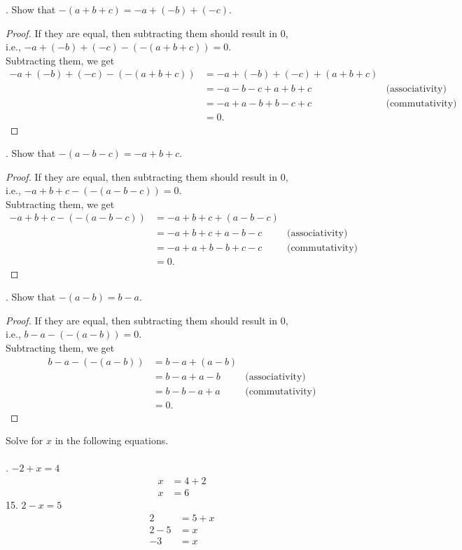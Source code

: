 \documentclass[12pt]{article}
\begin{document}
. Show that $-(a+b+c)=-a+(-b)+(-c)$.
\begin{proof}
If they are equal, then subtracting them should result in 0, \\
i.e., $-a+(-b)+(-c)-(-(a+b+c))=0$. \\
Subtracting them, we get
\begin{align*}
-a+(-b)+(-c)-(-(a+b+c))&=-a+(-b)+(-c)+(a+b+c) \\
&=-a-b-c+a+b+c &\text{(associativity)} \\
&=-a+a-b+b-c+c &\text{(commutativity)} \\
&=0.
\end{align*}
\end{proof}
. Show that $-(a-b-c)=-a+b+c$.
\begin{proof}
If they are equal, then subtracting them should result in 0, \\
i.e., $-a+b+c-(-(a-b-c))=0$. \\
Subtracting them, we get
\begin{align*}
-a+b+c-(-(a-b-c))&=-a+b+c+(a-b-c) \\
&=-a+b+c+a-b-c &\text{(associativity)} \\
&=-a+a+b-b+c-c &\text{(commutativity)} \\
&=0.
\end{align*}
\end{proof}
. Show that $-(a-b)=b-a$.
\begin{proof}
If they are equal, then subtracting them should result in 0, \\
i.e., $b-a-(-(a-b))=0$. \\
Subtracting them, we get
\begin{align*}
b-a-(-(a-b))&=b-a+(a-b) \\
&=b-a+a-b &\text{(associativity)} \\
&=b-b-a+a &\text{(commutativity)} \\
&=0.
\end{align*}
\end{proof}
\noindent Solve for $x$ in the following equations. \\
\\
. $-2+x=4$
\begin{align*}
x&=4+2 \\
x&=6
\end{align*}
15. $2-x=5$
\begin{align*}
2&=5+x \\
2-5&=x \\
-3&=x
\end{align*}
\end{document}
